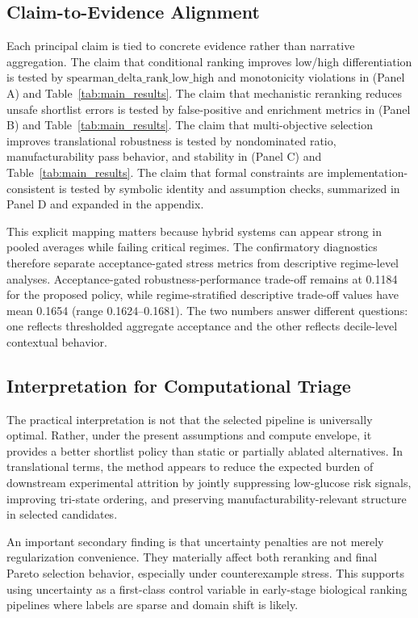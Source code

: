 \documentclass{article} %
\begin{document}
\subsection{Claim-to-Evidence Alignment}
Each principal claim is tied to concrete evidence rather than narrative aggregation. The claim that conditional ranking improves low/high differentiation is tested by $\text{spearman\_delta\_rank\_low\_high}$ and monotonicity violations in  (Panel A) and Table~\ref{tab:main_results}. The claim that mechanistic reranking reduces unsafe shortlist errors is tested by false-positive and enrichment metrics in  (Panel B) and Table~\ref{tab:main_results}. The claim that multi-objective selection improves translational robustness is tested by nondominated ratio, manufacturability pass behavior, and stability in  (Panel C) and Table~\ref{tab:main_results}. The claim that formal constraints are implementation-consistent is tested by symbolic identity and assumption checks, summarized in Panel D and expanded in the appendix.

This explicit mapping matters because hybrid systems can appear strong in pooled averages while failing critical regimes. The confirmatory diagnostics therefore separate acceptance-gated stress metrics from descriptive regime-level analyses. Acceptance-gated robustness-performance trade-off remains at 0.1184 for the proposed policy, while regime-stratified descriptive trade-off values have mean 0.1654 (range 0.1624--0.1681). The two numbers answer different questions: one reflects thresholded aggregate acceptance and the other reflects decile-level contextual behavior.

\subsection{Interpretation for Computational Triage}
The practical interpretation is not that the selected pipeline is universally optimal. Rather, under the present assumptions and compute envelope, it provides a better shortlist policy than static or partially ablated alternatives. In translational terms, the method appears to reduce the expected burden of downstream experimental attrition by jointly suppressing low-glucose risk signals, improving tri-state ordering, and preserving manufacturability-relevant structure in selected candidates.

An important secondary finding is that uncertainty penalties are not merely regularization convenience. They materially affect both reranking and final Pareto selection behavior, especially under counterexample stress. This supports using uncertainty as a first-class control variable in early-stage biological ranking pipelines where labels are sparse and domain shift is likely.
\end{document}
